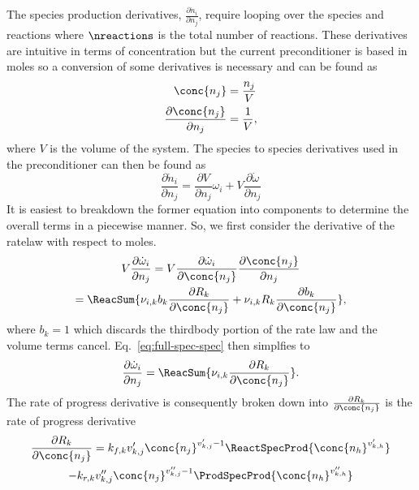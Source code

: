 %
%
The species production derivatives, $\frac{\partial \dot{n}_i}{\partial n_j}$, require looping over the species and reactions where $\nreactions$ is the total number of reactions.
These derivatives are intuitive in terms of concentration but the current preconditioner is based in moles so a conversion of some derivatives is necessary and can be found as
\begin{align}
    \conc{n_j} &= \frac{n_j}{V}\\
    \frac{\partial \conc{n_j}}{\partial n_j} &= \frac{1}{V},
\end{align}
where $V$ is the volume of the system.
The species to species derivatives used in the preconditioner can then be found as
\begin{equation}
    \frac{\partial \dot{n}_i}{\partial n_j} = \frac{\partial V}{\partial n_j} \omega_i + V\frac{\partial \dot{\omega}}{\partial n_j}
\end{equation}
It is easiest to breakdown the former equation into components to determine the overall terms in a piecewise manner.
So, we first consider the derivative of the ratelaw with respect to moles.
\begin{multline}
    \label{eq:full-spec-spec}
    V \frac{\partial \dot{\omega}_i}{\partial n_j} = V \frac{\partial \dot{\omega}_i}{\partial \conc{n_j}} \frac{\partial \conc{n_j}}{\partial n_j} \\ = \ReacSum{\nu_{i,k}b_k\frac{\partial R_k}{\partial \conc{n_j}} + \nu_{i,k}R_k\frac{\partial b_k}{\partial\conc{n_j}}},
\end{multline}
where $b_k=1$ which discards the thirdbody portion of the rate law and the volume terms cancel.
Eq.~\eqref{eq:full-spec-spec} then simplfies to
\begin{equation}
    \label{eq:spec-spec-derv}
    \frac{\partial \dot{\omega}_i}{\partial n_j} = \ReacSum{\nu_{i,k}\frac{\partial R_k}{\partial \conc{n_j}}}.
\end{equation}
The rate of progress derivative is consequently broken down into $\frac{\partial R_k}{\partial\conc{n_j}}$ is the rate of progress derivative
\begin{multline}
    \frac{\partial R_k}{\partial\conc{n_j}} = k_{f,k}{v_{k,j}^\prime} \conc{n_j}^{v_{k,j}^\prime-1}\ReactSpecProd{\conc{n_h}^{v_{k,h}^\prime}}\\
    -k_{r,k}v_{k,j}^{\prime\prime}\conc{n_j}^{v_{k,j}^{\prime\prime}-1}\ProdSpecProd{\conc{n_h}^{v_{k,h}^{\prime\prime}}}
\end{multline}
